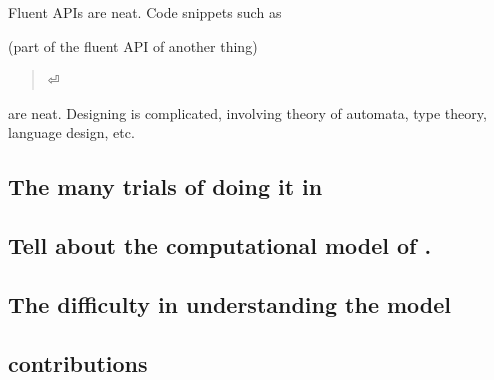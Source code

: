 Fluent APIs are neat.
Code snippets such as 
\begin{quote}
    \parbox[c]{44ex}{} 
\end{quote}
(part of the fluent API of another thing) 
\begin{quote}
    \parbox[c]{59ex}{}⏎
\end{quote}
are neat.  Designing is complicated,
involving theory of automata, type theory, language design, etc.

\subsection{The many trials of doing it in \Java}

\subsection{Tell about the computational model of \CC.}

\subsection{The difficulty in understanding the \Java model}

\subsection{contributions}

